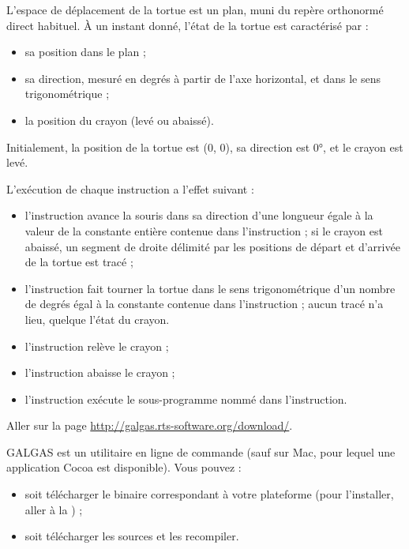 
L'espace de déplacement de la tortue est un plan, muni du repère orthonormé direct habituel. À un instant donné, l'état de la tortue est caractérisé par :
\begin{itemize}
  \item sa position dans le plan ;
  \item sa direction, mesuré en degrés à partir de l'axe horizontal, et dans le sens trigonométrique ;
  \item la position du crayon (levé ou abaissé).
\end{itemize}

Initialement, la position de la tortue est (0, 0), sa direction est 0°, et le crayon est levé.

L'exécution de chaque instruction a l'effet suivant :
\begin{itemize}
  \item l'instruction  avance la souris dans sa direction d'une longueur égale à la valeur de la constante entière contenue dans l'instruction ; si le crayon est abaissé, un segment de droite délimité par les positions de départ et d'arrivée de la tortue est tracé ;
  \item l'instruction  fait tourner la tortue dans le sens trigonométrique d'un nombre de degrés égal à la constante contenue dans l'instruction ; aucun tracé n'a lieu, quelque l'état du crayon.
  \item l'instruction  relève le crayon ;
  \item l'instruction  abaisse le crayon ;
  \item l'instruction  exécute le sous-programme nommé dans l'instruction.
\end{itemize}












Aller sur la page \url{http://galgas.rts-software.org/download/}.

GALGAS est un utilitaire en ligne de commande (sauf sur Mac, pour lequel une application Cocoa est disponible). Vous pouvez :
\begin{itemize}
  \item soit télécharger le binaire correspondant à votre plateforme (pour l'installer, aller à la ) ;
  \item soit télécharger les sources et les recompiler.
\end{itemize}





